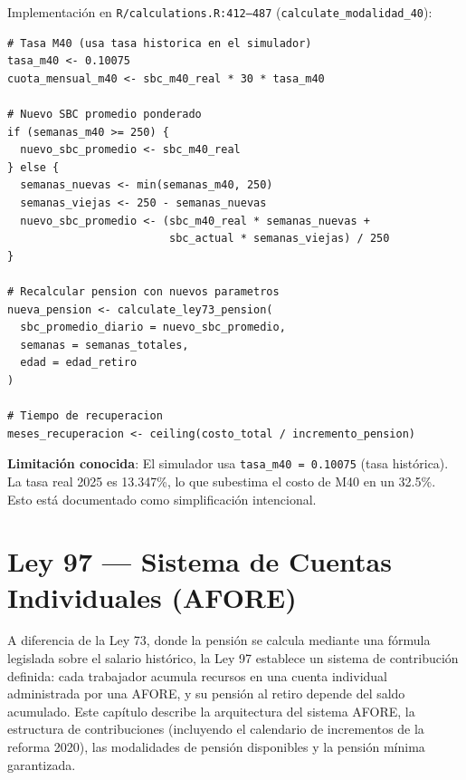 \documentclass[11pt,a4paper]{report}
\begin{document}
\begin{tcolorbox}[colback=orange!5!white, colframe=orange!75!black, title=\textbf{Aplicaci\'on en C\'odigo}]
Implementaci\'on en \texttt{R/calculations.R:412--487} (\texttt{calculate\_modalidad\_40}):

\begin{lstlisting}
# Tasa M40 (usa tasa historica en el simulador)
tasa_m40 <- 0.10075
cuota_mensual_m40 <- sbc_m40_real * 30 * tasa_m40

# Nuevo SBC promedio ponderado
if (semanas_m40 >= 250) {
  nuevo_sbc_promedio <- sbc_m40_real
} else {
  semanas_nuevas <- min(semanas_m40, 250)
  semanas_viejas <- 250 - semanas_nuevas
  nuevo_sbc_promedio <- (sbc_m40_real * semanas_nuevas +
                         sbc_actual * semanas_viejas) / 250
}

# Recalcular pension con nuevos parametros
nueva_pension <- calculate_ley73_pension(
  sbc_promedio_diario = nuevo_sbc_promedio,
  semanas = semanas_totales,
  edad = edad_retiro
)

# Tiempo de recuperacion
meses_recuperacion <- ceiling(costo_total / incremento_pension)
\end{lstlisting}

\textbf{Limitaci\'on conocida}: El simulador usa \texttt{tasa\_m40 = 0.10075} (tasa hist\'orica). La tasa real 2025 es 13.347\%, lo que subestima el costo de M40 en un 32.5\%. Esto est\'a documentado como simplificaci\'on intencional.
\end{tcolorbox}

\chapter{Ley 97 --- Sistema de Cuentas Individuales (AFORE)}

A diferencia de la Ley 73, donde la pensi\'on se calcula mediante una f\'ormula legislada sobre el salario hist\'orico, la Ley 97 establece un sistema de contribuci\'on definida: cada trabajador acumula recursos en una cuenta individual administrada por una AFORE, y su pensi\'on al retiro depende del saldo acumulado. Este cap\'itulo describe la arquitectura del sistema AFORE, la estructura de contribuciones (incluyendo el calendario de incrementos de la reforma 2020), las modalidades de pensi\'on disponibles y la pensi\'on m\'inima garantizada.
\end{document}
